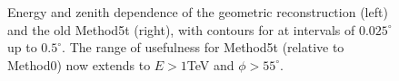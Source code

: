 \documentclass[main.tex]{subfiles}
\begin{document}
\begin{figure}[htbp]
  \centering
  \caption[Energy and zenith dependence of Method0 and the old Method5t]{Energy and zenith dependence of the geometric reconstruction (left) and the old Method5t (right), with contours for \rse at intervals of $0.025^\circ$ up to $0.5^\circ$. The range of usefulness for Method5t (relative to Method0) now extends to $E>1$TeV and $\phi>55^\circ$.}
  \label{fig:energy_contour}
\end{figure}
\end{document}
